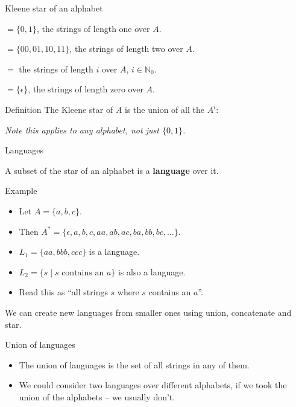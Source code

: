 \begin{frame}{Kleene star of an alphabet}
  
  \begin{description}[abc]
    \item[$A^1$] $= \{0,1\}$, the strings of length one over $A$.
    \item[$A^2$] $= \{00,01,10,11\}$, the strings of length two over $A$.
    \item[$A^i$] $=$ the strings of length $i$ over $A$, $i \in \mathbb{N}_0$.
    \item[$A^0$] $= \{\epsilon\}$, the strings of length zero over $A$.
  \end{description}

  \begin{exampleblock}{Definition}
    The Kleene star of $A$ is the union of all the $A^i$:
  \end{exampleblock}

  \emph{Note this applies to any alphabet, not just $\{0,1\}$.}
\end{frame}


\begin{frame}{Languages}

  A subset of the star of an alphabet is a \textbf{language} over it.

  \begin{exampleblock}{Example}
    \begin{itemize}
      \item Let $A = \{a,b,c\}$.
      \item Then $A^*=\{\epsilon,a,b,c,aa,ab,ac,ba,bb,bc,\ldots\}$.
      \item $L_1 = \{aa,bbb,ccc\}$ is a language.
      \item $L_2 = \{s \mid s \textrm{ contains an } a \}$ is also a language.
      \item Read this as ``all strings $s$ where $s$ contains an $a$''.
    \end{itemize}
  \end{exampleblock}

  We can create new languages from smaller ones using union, concatenate and star.
\end{frame}


\begin{frame}{Union of languages}
  
  \begin{itemize}
    \setlength\itemsep{4mm}
    \item The union of languages is the set of all strings in any of them.
    \item We could consider two languages over different alphabets, if we took the union of the alphabets -- we usually don't.
  \end{itemize}
\end{frame}


